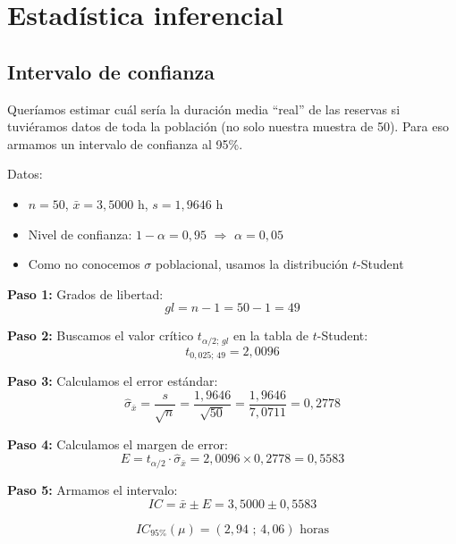 \documentclass[12pt,a4paper]{article}
\begin{document}
\section{Estadística inferencial}

\subsection{Intervalo de confianza}

Queríamos estimar cuál sería la duración media ``real'' de las reservas si tuviéramos datos de toda la población (no solo nuestra muestra de 50). Para eso armamos un intervalo de confianza al 95\%.

Datos:
\begin{itemize}[itemsep=4pt]
  \item $n = 50$, \quad $\bar{x} = 3{,}5000$ h, \quad $s = 1{,}9646$ h
  \item Nivel de confianza: $1 - \alpha = 0{,}95$ \quad $\Rightarrow$ \quad $\alpha = 0{,}05$
  \item Como no conocemos $\sigma$ poblacional, usamos la distribución $t$-Student
\end{itemize}

\vspace{6pt}
\textbf{Paso 1:} Grados de libertad:
$$gl = n - 1 = 50 - 1 = 49$$

\vspace{6pt}
\textbf{Paso 2:} Buscamos el valor crítico $t_{\alpha/2;\,gl}$ en la tabla de $t$-Student:
$$t_{0{,}025;\,49} = 2{,}0096$$

\vspace{6pt}
\textbf{Paso 3:} Calculamos el error estándar:
$$\hat{\sigma}_{\bar{x}} = \frac{s}{\sqrt{n}} = \frac{1{,}9646}{\sqrt{50}} = \frac{1{,}9646}{7{,}0711} = 0{,}2778$$

\vspace{6pt}
\textbf{Paso 4:} Calculamos el margen de error:
$$E = t_{\alpha/2} \cdot \hat{\sigma}_{\bar{x}} = 2{,}0096 \times 0{,}2778 = 0{,}5583$$

\vspace{6pt}
\textbf{Paso 5:} Armamos el intervalo:
$$IC = \bar{x} \pm E = 3{,}5000 \pm 0{,}5583$$

$$\boxed{IC_{95\%}(\mu) = (2{,}94 \text{ ; } 4{,}06) \text{ horas}}$$
\vspace{4pt}
\end{document}

